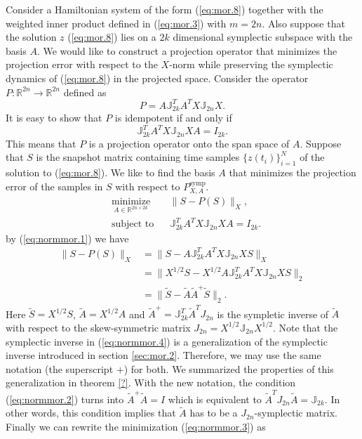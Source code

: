 Consider a Hamiltonian system of the form (\ref{eq:mor.8}) together with the weighted inner product defined in (\ref{eq:mor.3}) with $m=2n$. Also suppose that the solution $z$ (\ref{eq:mor.8}) lies on a $2k$ dimensional symplectic subspace with the basis $A$. We would like to construct a projection operator that minimizes the projection error with respect to the $X$-norm while preserving the symplectic dynamics of (\ref{eq:mor.8}) in the projected space. Consider the operator $P: \mathbb R^{2n} \to \mathbb R^{2n}$ defined as
\begin{equation} \label{eq:normmor.1}
	P = A \mathbb J_{2k}^T A^T X \mathbb J_{2n} X.
\end{equation}
It is easy to show that $P$ is idempotent if and only if
\begin{equation} \label{eq:normmor.2}
	\mathbb J_{2k}^T A^T X \mathbb J_{2n} X A = I_{2k}.
\end{equation}
This means that $P$ is a projection operator onto the span space of $A$. Suppose that $S$ is the snapshot matrix containing time samples $\{z(t_i)\}_{i=1}^N$ of the solution to (\ref{eq:mor.8}). We like to find the basis $A$ that minimizes the projection error of the samples in $S$ with respect to $P_{X,A}^{\text{symp}}$.
\begin{equation} \label{eq:normmor.3}
\begin{aligned}
& \underset{A\in \mathbb{R}^{2n\times 2k}}{\text{minimize}}
& & \| S - P(S) \|_X, \\
& \text{subject to}
& & \mathbb J_{2k}^T A^T X \mathbb J_{2n} X A = I_{2k}.
\end{aligned}
\end{equation}
by (\ref{eq:normmor.1}) we have
\begin{equation} \label{eq:normmor.4}
\begin{aligned}
	\| S - P(S) \|_X &= \| S - A \mathbb J_{2k}^T A^T X \mathbb J_{2n} X S \|_X \\
	&= \| X^{1/2} S - X^{1/2} A \mathbb J_{2k}^T A^T X \mathbb J_{2n} X S \|_2 \\
	&= \| \tilde S - \tilde A \tilde A ^+ \tilde S \|_2.
\end{aligned}
\end{equation}
Here $\tilde S = X^{1/2} S$, $\tilde A = X^{1/2} A$ and $\tilde A^+ = \mathbb J_{2k}^T \tilde A^T J_{2n}$ is the sympletic inverse of $\tilde A$ with respect to the skew-symmetric matrix $J_{2n} = X^{1/2} \mathbb J_{2n} X^{1/2}$. Note that the symplectic inverse in (\ref{eq:normmor.4}) is a generalization of the symplectic inverse introduced in section \ref{sec:mor.2}. Therefore, we may use the same notation (the superscript $+$) for both. We summarized the properties of this generalization in theorem \ref{?}. With the new notation, the condition (\ref{eq:normmor.2}) turns into $\tilde A ^+ \tilde A = I$ which is equivalent to $\tilde A ^T J_{2n} \tilde A = \mathbb J_{2k}$. In other words, this condition implies that $\tilde A$ has to be a $J_{2n}$-symplectic matrix. Finally we can rewrite the minimization (\ref{eq:normmor.3}) as
